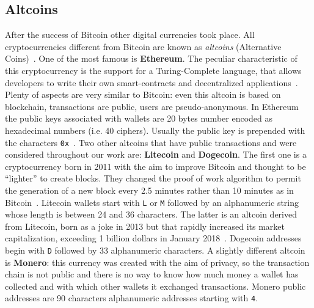 \subsection{Altcoins}
After the success of Bitcoin other digital currencies took place.
All cryptocurrencies different from Bitcoin are known as
\emph{altcoins} (Alternative Coins)~\cite{bib:bitcoinbeyond}.
One of the most famous is
\textbf{Ethereum}. The peculiar characteristic of this cryptocurrency is
the support for a Turing-Complete language, that allows developers to
write their own smart-contracts and decentralized
applications~\cite{bib:ethereum:whitepaper}.
Plenty of aspects are very similar to Bitcoin: even
this altcoin is based on blockchain, transactions are public, users are
pseudo-anonymous. In Ethereum the public keys associated with wallets are 20
bytes number encoded as hexadecimal numbers (i.e. 40 ciphers). Usually
the public key is prepended with the characters
\texttt{0x}~\cite{bib:ethereum:whitepaper}.
Two other altcoins that have public transactions and were considered
throughout our work are: \textbf{Litecoin} and \textbf{Dogecoin}.
The first one is a cryptocurrency born in 2011 with the aim to improve
Bitcoin and thought to be ``lighter'' to create blocks.
They changed the proof of work algorithm to permit the
generation of a new block every 2.5 minutes rather than 10 minutes as in
Bitcoin~\cite{bib:litecoin:wiki}.
Litecoin wallets start with \texttt{L} or \texttt{M} followed by an
alphanumeric string whose length is between 24 and 36 characters.
The latter is an altcoin derived from Litecoin, born as a joke in 2013
but that rapidly increased its market capitalization, exceeding 1
billion dollars in January 2018~\cite{bib:dogecoin:marketcap}.
Dogecoin addresses begin with \texttt{D} followed by 33 alphanumeric
characters. A slightly different altcoin is \textbf{Monero}: this currency was
created with the aim of privacy, so the transaction chain is not public
and there is no way to know how much money a wallet has collected and
with which other wallets it exchanged transactions.
Monero public addresses are 90 characters alphanumeric addresses starting
with \texttt{4}.


